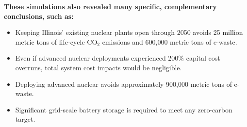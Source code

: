 \textbf{These simulations also revealed many specific, complementary 
conclusions, such as:}
\begin{itemize}
        \item Keeping Illinois' existing nuclear plants open through 
                2050 avoids 25 million metric tons of life-cycle CO$_2$ 
                emissions and 600,000 metric tons of e-waste.
        \item Even if advanced nuclear deployments experienced 200\% capital 
                cost overruns, total system cost impacts would be negligible.
        \item Deploying advanced nuclear avoids approximately 900,000 metric 
                tons of e-waste. 
        \item Significant grid-scale battery storage is required to meet any zero-carbon 
                target.
\end{itemize}





